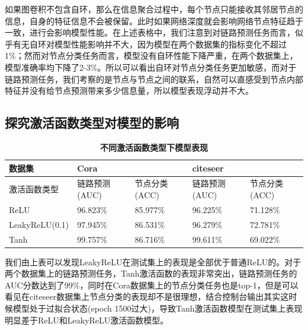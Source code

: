 \documentclass{article}
\begin{document}
	如果图卷积不包含自环，那么在信息聚合过程中，每个节点只能接收其邻居节点的信息，自身的特征信息不会被保留。此时如果网络深度就会影响网络节点特征趋于一致，进行会影响模型性能。在上述表格中，我们注意到对链路预测任务而言，似乎有无自环对模型性能影响并不大，因为模型在两个数据集的指标变化不超过1\%；然而对节点分类任务而言，模型没有自环性能下降严重，在两个数据集上，模型准确率均下降了2-3\%。所以可以看出自环对节点分类任务更加敏感，而对于链路预测任务，我们考察的是节点与节点之间的联系，自然可以直感受到节点内部特征并没有给节点预测带来多少信息量，所以模型表现浮动并不大。
	
	\clearpage
		\subsection{探究激活函数类型对模型的影响}
	
	\begin{table}[!ht]
		\caption{\textbf{不同激活函数类型下模型表现}}%
		\centering%
		\begin{tabular}{|l|ll|ll|}
			\hline
			数据集 & \multicolumn{2}{l|}{Cora} & \multicolumn{2}{l|}{citeseer} \\ \hline
			激活函数类型  & 链路预测(AUC)   & 节点分类(ACC)   & 链路预测(AUC)     & 节点分类(ACC)     \\ \hline
			ReLU   &  96.823\%       &   85.977\%     & 96.225\%             & 71.128\%              \\
			LeakyReLU(0.1)  &97.945\%&86.531\%        &96.279\%              &72.781\%              \\
			Tanh   &  99.757\%       &  86.716\%      & 99.611\%            & 69.022\%              \\ \hline 
		\end{tabular}
	\end{table}
	我们由上表可以发现LeakyReLU在测试集上的表现是全部优于普通ReLU的。对于两个数据集上的链路预测任务，Tanh激活函数的表现非常突出，链路预测任务的AUC分数达到了99\%，同时在Cora数据集上的节点分类任务也是top-1，但是可以看见在citeseer数据集上节点分类的表现却不是很理想，结合控制台输出其实这时候模型处于过拟合状态(epoch 1500过大)，导致Tanh激活函数模型在测试集上表现明显差于ReLU和LeakyReLU激活函数模型。
	
\end{document}
